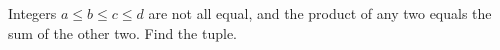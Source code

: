 Integers $a\le b\le c\le d$ are not all equal, and the product of any two equals the sum of the other two. Find the tuple.
